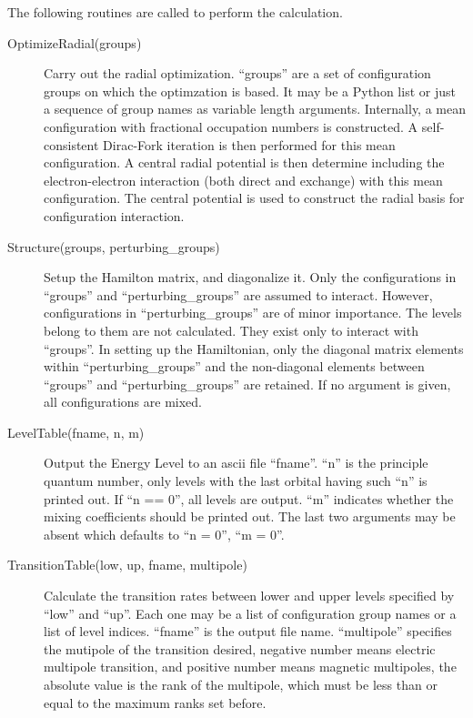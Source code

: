 \documentclass[12pt]{article}
\begin{document}
The following routines are called to perform the calculation.
\begin{description}
\item[OptimizeRadial(groups)] 
Carry out the radial optimization. ``groups'' are a set of configuration
groups on which the optimzation is based. It may be a Python list or just a
sequence of group names as variable length arguments. Internally, a mean
configuration with fractional 
occupation numbers is constructed. A self-consistent Dirac-Fork iteration
is then performed for this mean configuration. A central radial potential is
then determine including the electron-electron interaction (both direct and
exchange) with this mean configuration. The central potential is used to
construct the radial basis for configuration interaction. 

\item[Structure(groups, perturbing\_groups)] 
Setup the Hamilton matrix, and diagonalize
it. Only the configurations in ``groups'' and ``perturbing\_groups'' are
assumed to interact. However, configurations in ``perturbing\_groups'' are of
minor importance. The levels belong to them are not calculated. They exist
only to interact with ``groups''. In setting up the Hamiltonian, only the
diagonal matrix elements within ``perturbing\_groups'' and the non-diagonal
elements between ``groups'' and ``perturbing\_groups'' are retained. If no
argument is given, all configurations are mixed.  

\item[LevelTable(fname, n, m)] 
Output the Energy Level to an ascii file ``fname''. ``n'' is the principle
quantum number, only levels with the last orbital having such ``n'' is printed
out. If ``n == 0'', all levels are output. ``m'' indicates whether the mixing
coefficients should be printed out. The last two arguments may be absent which
defaults to ``n = 0'', ``m = 0''.

\item[TransitionTable(low, up, fname, multipole)] 
Calculate the transition rates between lower and upper levels specified by
``low'' and ``up''. Each one may be a list of configuration group names or a
list of level indices. ``fname'' is the output file name. ``multipole''
specifies the mutipole of the transition desired, negative number means
electric multipole transition, and positive number means magnetic multipoles,
the absolute value is the rank of the multipole, which must be less than or
equal to the maximum ranks set before. 
\end{description}
\end{document}
